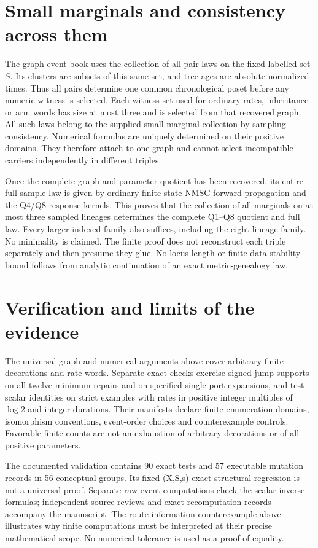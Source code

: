\documentclass[11pt]{article}
\begin{document}
\section{Small marginals and consistency across them}
The graph event book uses the collection of all pair laws on the fixed labelled set $S$. Its clusters are subsets of this same set, and tree ages are absolute normalized times. Thus all pairs determine one common chronological poset before any numeric witness is selected. Each witness set used for ordinary rates, inheritance or arm words has size at most three and is selected from that recovered graph. All such laws belong to the supplied small-marginal collection by sampling consistency. Numerical formulas are uniquely determined on their positive domains. They therefore attach to one graph and cannot select incompatible carriers independently in different triples.

Once the complete graph-and-parameter quotient has been recovered, its entire full-sample law is given by ordinary finite-state NMSC forward propagation and the Q4/Q8 response kernels. This proves that the collection of all marginals on at most three sampled lineages determines the complete Q1--Q8 quotient and full law. Every larger indexed family also suffices, including the eight-lineage family. No minimality is claimed. The finite proof does not reconstruct each triple separately and then presume they glue. No locus-length or finite-data stability bound follows from analytic continuation of an exact metric-genealogy law.

\section{Verification and limits of the evidence}
The universal graph and numerical arguments above cover arbitrary finite decorations and rate words. Separate exact checks exercise signed-jump supports on all twelve minimum repairs and on specified single-port expansions, and test scalar identities on strict examples with rates in positive integer multiples of $\log 2$ and integer durations. Their manifests declare finite enumeration domains, isomorphism conventions, event-order choices and counterexample controls. Favorable finite counts are not an exhaustion of arbitrary decorations or of all positive parameters.

The documented validation contains 90 exact tests and 57 executable mutation records in 56 conceptual groups. Its fixed-(X,S,s) exact structural regression is not a universal proof. Separate raw-event computations check the scalar inverse formulas; independent source reviews and exact-recomputation records accompany the manuscript. The route-information counterexample above illustrates why finite computations must be interpreted at their precise mathematical scope. No numerical tolerance is used as a proof of equality.
\end{document}

